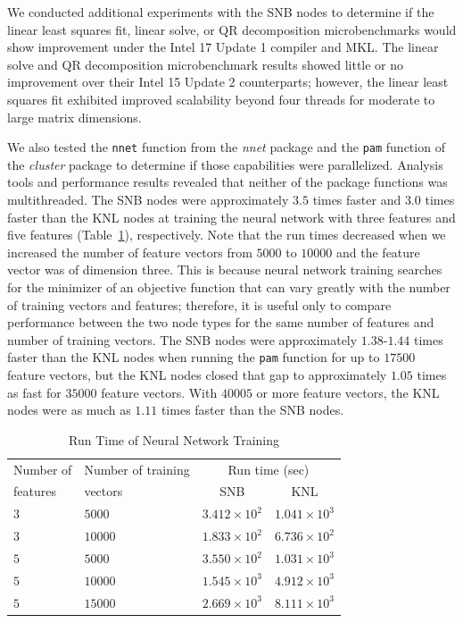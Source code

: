 We conducted additional experiments with the SNB nodes to determine if the linear least
squares fit, linear solve, or QR decomposition microbenchmarks would show improvement
under the Intel 17 Update 1 compiler and MKL. The linear solve and QR decomposition
microbenchmark results showed little or no improvement over their Intel 15 Update 2
counterparts; however, the linear least squares fit exhibited improved scalability beyond
four threads for moderate to large matrix dimensions.

We also tested the \texttt{nnet} function from the \textit{nnet} package and the
\texttt{pam} function of the \textit{cluster} package to determine if those capabilities
were parallelized.
Analysis tools and performance results revealed that neither of the package functions was
multithreaded.  The SNB nodes were approximately $3.5$
times faster and $3.0$ times faster than the KNL nodes at training the neural network with
three features and five features (Table~\ref{tab:nnetResults}), respectively. Note that
the run times decreased when we increased the number of feature vectors from $5000$ to
$10000$ and the feature vector was of dimension three. This is because neural network
training searches for the minimizer of an objective function that can vary
greatly with the number of training vectors and features; therefore, it is useful only to
compare performance between the two node types for the same number of features and number
of training vectors.  The SNB nodes were approximately $1.38$-$1.44$ times faster than the
KNL nodes when running the \texttt{pam} function for up to $17500$ feature vectors, but
the KNL nodes closed that gap to approximately $1.05$ times as fast for $35000$ feature
vectors. With $40005$ or more feature vectors, the KNL nodes were as much as $1.11$ times
faster than the SNB nodes.

\begin{table}
  \caption{Run Time of Neural Network Training}
  \label{tab:nnetResults}
  \begin{tabular}{llcc}
    \toprule
      Number of & Number of training & \multicolumn{2}{c}{Run time (sec)}\\
      features  & vectors            & SNB & KNL\\
    \midrule
    $3$ & $5000$  & $3.412\times 10^{2}$ & $1.041\times 10^{3}$ \\
    $3$ & $10000$ & $1.833\times 10^{2}$ & $6.736\times 10^{2}$ \\
    $5$ & $5000$  & $3.550\times 10^{2}$ & $1.031\times 10^{3}$ \\
    $5$ & $10000$ & $1.545\times 10^{3}$ & $4.912\times 10^{3}$ \\
    $5$ & $15000$ & $2.669\times 10^{3}$ & $8.111\times 10^{3}$ \\
    \bottomrule
  \end{tabular}
\end{table}

